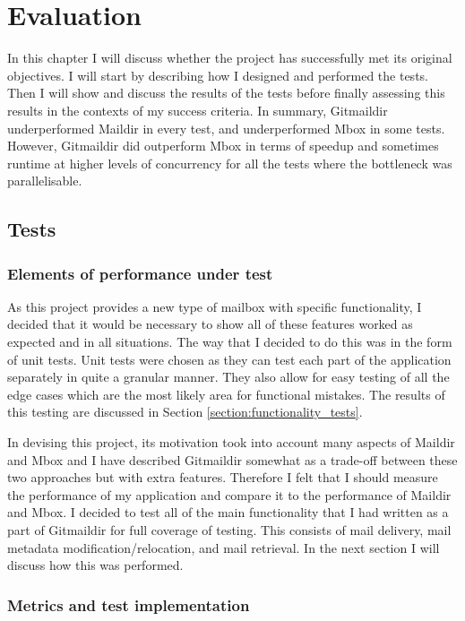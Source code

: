 \chapter{Evaluation} \label{section:evaluation}

In this chapter I will discuss whether the project has successfully met its original objectives. I will start by describing how I designed and performed the tests. Then I will show and discuss the results of the tests before finally assessing this results in the contexts of my success criteria. In summary, Gitmaildir underperformed Maildir in every test, and underperformed Mbox in some tests. However, Gitmaildir did outperform Mbox in terms of speedup and sometimes runtime at higher levels of concurrency for all the tests where the bottleneck was parallelisable.

\section{Tests}

\subsection{Elements of performance under test}

As this project provides a new type of mailbox with specific functionality, I decided that it would be necessary to show all of these features worked as expected and in all situations. The way that I decided to do this was in the form of unit tests. Unit tests were chosen as they can test each part of the application separately in quite a granular manner. They also allow for easy testing of all the edge cases which are the most likely area for functional mistakes. The results of this testing are discussed in Section \ref{section:functionality_tests}.

In devising this project, its motivation took into account many aspects of Maildir and Mbox and I have described Gitmaildir somewhat as a trade-off between these two approaches but with extra features. Therefore I felt that I should measure the performance of my application and compare it to the performance of Maildir and Mbox. I decided to test all of the main functionality that I had written as a part of Gitmaildir for full coverage of testing. This consists of mail delivery, mail metadata modification/relocation, and mail retrieval. In the next section I will discuss how this was performed.

\subsection{Metrics and test implementation}

